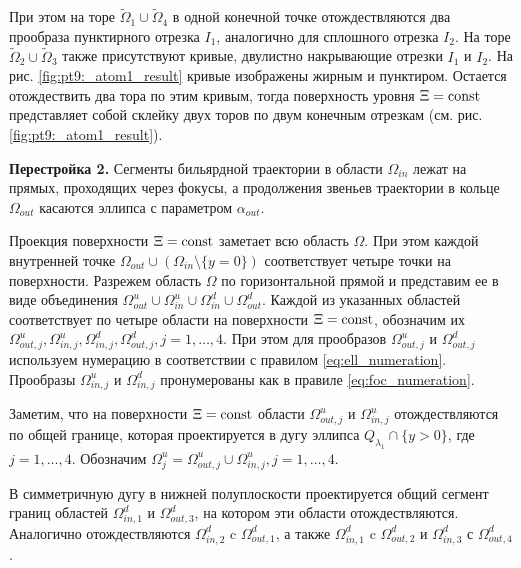 При этом на торе $\widetilde{\Omega}_1 \cup \widetilde{\Omega}_4$ в одной конечной точке отождествляются два прообраза пунктирного  отрезка $I_1$, аналогично для сплошного отрезка $I_2$. На  торе $\widetilde{\Omega}_2 \cup \widetilde{\Omega}_3$ также присутствуют кривые, двулистно накрывающие отрезки $I_1$ и  $I_2$.
На рис. \ref{fig:pt9:_atom1_result} кривые изображены жирным и пунктиром.
Остается отождествить два тора по этим кривым, тогда поверхность уровня $\Xi = \mathrm{const}$ представляет собой склейку двух торов по двум конечным отрезкам (см. рис. \ref{fig:pt9:_atom1_result}). 


\textbf{Перестройка 2.} 
Сегменты бильярдной траектории в области $\Omega_{in}$ лежат на прямых, проходящих через фокусы, а продолжения звеньев траектории в кольце $\Omega_{out}$ касаются эллипса с параметром $\alpha_{out}$. 

Проекция поверхности $\Xi = \mathrm{const}$ заметает всю область $\Omega$. При этом каждой внутренней точке $\Omega_{out} \cup (\Omega_{in} \setminus \{y=0\})$ соответствует четыре точки на поверхности.
Разрежем область $\Omega$ по горизонтальной прямой и представим  ее в виде объединения $\Omega_{out}^u \cup \Omega_{in}^u \cup \Omega_{in}^d \cup \Omega_{out}^d$. 
Каждой из указанных областей соответствует по четыре области на поверхности $\Xi = \mathrm{const}$, обозначим их $\Omega_{out, j}^u , \Omega_{in, j}^u , \Omega_{in, j}^d , \Omega_{out, j}^d, j=1, \ldots, 4$. 
При этом для прообразов $\Omega_{out, j}^u$ и $\Omega_{out, j}^d$ используем нумерацию в соответствии с правилом \eqref{eq:ell_numeration}. 
Прообразы $\Omega_{in, j}^u$ и $\Omega_{in, j}^d$ пронумерованы как в правиле \eqref{eq:foc_numeration}.

Заметим, что на поверхности $\Xi = \mathrm{const}$ области $\Omega_{out, j}^u$ и $\Omega_{in, j}^u$ отождествляются по общей границе, которая проектируется в дугу эллипса $Q_{\lambda_1} \cap \{ y > 0\}$, где $j=1, \ldots,4$. Обозначим $\Omega_j^u = \Omega_{out, j}^u \cup \Omega_{in, j}^u, j=1, \ldots, 4$.

В симметричную дугу в нижней полуплоскости проектируется общий сегмент границ областей $\Omega_{in, 1}^d$ и $\Omega_{out, 3}^d$, на котором эти области отождествляются. 
Аналогично  отождествляются $\Omega_{in, 2}^d$ c $\Omega_{out, 1}^d$, а также $\Omega_{in, 1}^d$ c $\Omega_{out, 2}^d$ и $\Omega_{in, 3}^d$ с $ \Omega_{out, 4}^d$.

